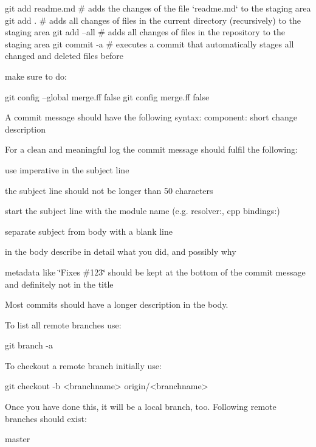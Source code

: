 
\begin{DoxyCode}
git add readme.md   # adds the changes of the file `readme.md` to the staging area
git add .           # adds all changes of files in the current directory (recursively) to the staging area
git add --all       # adds all changes of files in the repository to the staging area
git commit -a       # executes a commit that automatically stages all changed and deleted files before
\end{DoxyCode}


make sure to do\+:


\begin{DoxyCode}
git config --global merge.ff false
git config merge.ff false
\end{DoxyCode}


A commit message should have the following syntax\+: {\ttfamily component\+: short change description}

For a clean and meaningful log the commit message should fulfil the following\+:


\begin{DoxyItemize}
\item use imperative in the subject line
\item the subject line should not be longer than 50 characters
\item start the subject line with the module name (e.\+g. resolver\+:, cpp bindings\+:)
\item separate subject from body with a blank line
\item in the body describe in detail what you did, and possibly why
\item metadata like \char`\"{}\+Fixes \#123\char`\"{} should be kept at the bottom of the commit message and definitely not in the title
\end{DoxyItemize}

Most commits should have a longer description in the body.

To list all remote branches use\+:


\begin{DoxyCode}
git branch -a
\end{DoxyCode}


To checkout a remote branch initially use\+:


\begin{DoxyCode}
git checkout -b <branchname> origin/<branchname>
\end{DoxyCode}


Once you have done this, it will be a local branch, too. Following remote branches should exist\+: \begin{DoxyVerb}master
\end{DoxyVerb}


